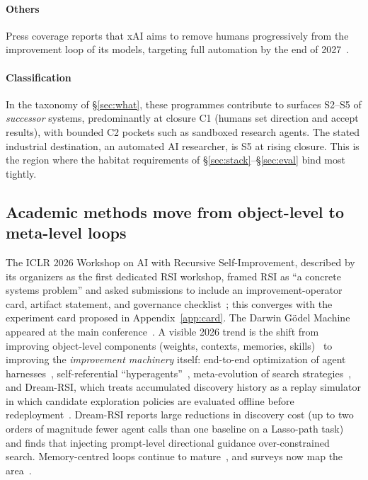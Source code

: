 \documentclass[11pt,a4paper]{article}
\begin{document}
\paragraph{Others} Press coverage reports that xAI aims to remove humans progressively from the improvement loop of its models, targeting full automation by the end of 2027~\cite{ap2026rsi}.

\paragraph{Classification} In the taxonomy of \S\ref{sec:what}, these programmes contribute to surfaces S2--S5 of \emph{successor} systems, predominantly at closure C1 (humans set direction and accept results), with bounded C2 pockets such as sandboxed research agents. The stated industrial destination, an automated AI researcher, is S5 at rising closure. This is the region where the habitat requirements of \S\ref{sec:stack}--\S\ref{sec:eval} bind most tightly.

\subsection{Academic methods move from object-level to meta-level loops}\label{sec:academic}
The ICLR 2026 Workshop on AI with Recursive Self-Improvement, described by its organizers as the first dedicated RSI workshop, framed RSI as ``a concrete systems problem'' and asked submissions to include an improvement-operator card, artifact statement, and governance checklist~\cite{iclr2026rsi}; this converges with the experiment card proposed in Appendix~\ref{app:card}. The Darwin G\"odel Machine appeared at the main conference~\cite{zhang2025dgm}. A visible 2026 trend is the shift from improving object-level components (weights, contexts, memories, skills)~\cite{zhang2026ace,ouyang2026reasoningbank,huang2026rzero} to improving the \emph{improvement machinery} itself: end-to-end optimization of agent harnesses~\cite{lee2026metaharness}, self-referential ``hyperagents''~\cite{zhang2026hyperagents}, meta-evolution of search strategies~\cite{liu2026evox}, and Dream-RSI, which treats accumulated discovery history as a replay simulator in which candidate exploration policies are evaluated offline before redeployment~\cite{zheng2026dreamrsi}. Dream-RSI reports large reductions in discovery cost (up to two orders of magnitude fewer agent calls than one baseline on a Lasso-path task) and finds that injecting prompt-level directional guidance over-constrained search. Memory-centred loops continue to mature~\cite{zhu2026rsiagent,du2026automem,yu2026recuris}, and surveys now map the area~\cite{chen2026survey,liu2026pathrsi}.
\end{document}
